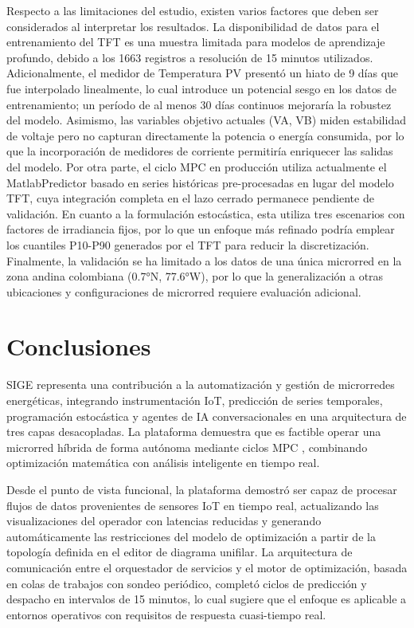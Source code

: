 \documentclass[journal,article,submit,pdftex,moreauthors]{Definitions/mdpi}
\begin{document}
Respecto a las limitaciones del estudio, existen varios factores que deben ser considerados al interpretar los resultados. La disponibilidad de datos para el entrenamiento del TFT es una muestra limitada para modelos de aprendizaje profundo, debido a los 1663 registros a resolución de 15 minutos utilizados. Adicionalmente, el medidor de Temperatura PV presentó un hiato de 9 días que fue interpolado linealmente, lo cual introduce un potencial sesgo en los datos de entrenamiento; un período de al menos 30 días continuos mejoraría la robustez del modelo. Asimismo, las variables objetivo actuales (VA, VB) miden estabilidad de voltaje pero no capturan directamente la potencia o energía consumida, por lo que la incorporación de medidores de corriente permitiría enriquecer las salidas del modelo. Por otra parte, el ciclo MPC en producción utiliza actualmente el MatlabPredictor basado en series históricas pre-procesadas en lugar del modelo TFT, cuya integración completa en el lazo cerrado permanece pendiente de validación. En cuanto a la formulación estocástica, esta utiliza tres escenarios con factores de irradiancia fijos, por lo que un enfoque más refinado podría emplear los cuantiles P10-P90 generados por el TFT para reducir la discretización. Finalmente, la validación se ha limitado a los datos de una única microrred en la zona andina colombiana (0.7°N, 77.6°W), por lo que la generalización a otras ubicaciones y configuraciones de microrred requiere evaluación adicional.
\section{Conclusiones}
SIGE representa una contribuci\'on a la automatizaci\'on y gesti\'on de microrredes energ\'eticas, integrando instrumentaci\'on IoT, predicci\'on de series temporales, programaci\'on estoc\'astica y agentes de IA conversacionales en una arquitectura de tres capas desacopladas. La plataforma demuestra que es factible operar una microrred h\'ibrida de forma aut\'onoma mediante ciclos MPC , combinando optimizaci\'on matem\'atica con an\'alisis inteligente en tiempo real.

Desde el punto de vista funcional, la plataforma demostr\'o ser capaz de procesar flujos de datos provenientes de sensores IoT en tiempo real, actualizando las visualizaciones del operador con latencias reducidas y generando autom\'aticamente las restricciones del modelo de optimizaci\'on a partir de la topolog\'ia definida en el editor de diagrama unifilar. La arquitectura de comunicaci\'on entre el orquestador de servicios y el motor de optimizaci\'on, basada en colas de trabajos con sondeo peri\'odico, complet\'o ciclos de predicci\'on y despacho en intervalos de 15 minutos, lo cual sugiere que el enfoque es aplicable a entornos operativos con requisitos de respuesta cuasi-tiempo real.
\end{document}
